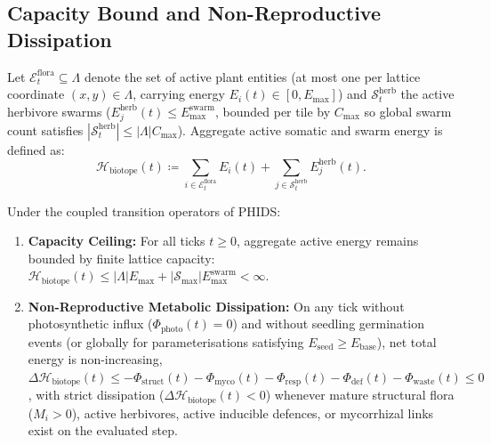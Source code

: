 \subsection{Capacity Bound and Non-Reproductive Dissipation}
\label{subsec:thermodynamic_conservation}

Let $\mathcal{E}_t^{\mathrm{flora}} \subseteq \Lambda$ denote the set of active plant entities (at most one per lattice coordinate $(x, y) \in \Lambda$, carrying energy $E_i(t) \in [0, E_{\max}]$) and $\mathcal{S}_t^{\mathrm{herb}}$ the active herbivore swarms ($E_j^{\mathrm{herb}}(t) \le E_{\max}^{\mathrm{swarm}}$, bounded per tile by $C_{\max}$ so global swarm count satisfies $|\mathcal{S}_t^{\mathrm{herb}}| \le |\Lambda| C_{\max}$). Aggregate active somatic and swarm energy is defined as:
\begin{equation}
  \mathcal{H}_{\mathrm{biotope}}(t) \coloneqq \sum_{i \in \mathcal{E}_t^{\mathrm{flora}}} E_i(t) + \sum_{j \in \mathcal{S}_t^{\mathrm{herb}}} E_j^{\mathrm{herb}}(t).
  \label{eq:aggregate_energy_def}
\end{equation}

\begin{proposition}
\label{prop:capacity_boundedness}
Under the coupled transition operators of PHIDS:
\begin{enumerate}
  \item \textbf{Capacity Ceiling:} For all ticks $t \ge 0$, aggregate active energy remains bounded by finite lattice capacity: $\mathcal{H}_{\mathrm{biotope}}(t) \le |\Lambda| E_{\max} + |\mathcal{S}_{\max}| E_{\max}^{\mathrm{swarm}} < \infty$.
  \item \textbf{Non-Reproductive Metabolic Dissipation:} On any tick without photosynthetic influx ($\Phi_{\mathrm{photo}}(t) = 0$) and without seedling germination events (or globally for parameterisations satisfying $E_{\mathrm{seed}} \ge E_{\mathrm{base}}$), net total energy is non-increasing, $\Delta \mathcal{H}_{\mathrm{biotope}}(t) \le -\Phi_{\mathrm{struct}}(t) - \Phi_{\mathrm{myco}}(t) - \Phi_{\mathrm{resp}}(t) - \Phi_{\mathrm{def}}(t) - \Phi_{\mathrm{waste}}(t) \le 0$, with strict dissipation ($\Delta \mathcal{H}_{\mathrm{biotope}}(t) < 0$) whenever mature structural flora ($M_i > 0$), active herbivores, active inducible defences, or mycorrhizal links exist on the evaluated step.
\end{enumerate}
\end{proposition}

